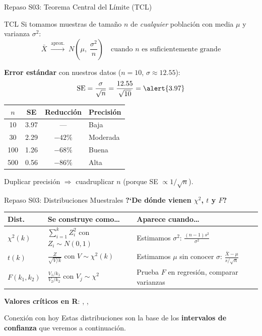\documentclass[aspectratio=169, 11pt]{beamer}
\begin{document}
\begin{frame}{Repaso S03: Teorema Central del L\'imite (TCL)}
\begin{block}{TCL}
Si tomamos muestras de tama\~no $n$ de \emph{cualquier} poblaci\'on con media $\mu$ y varianza $\sigma^2$:
\[
\bar{X} \;\xrightarrow{\text{aprox.}}\; N\!\left(\mu, \;\frac{\sigma^2}{n}\right)
\quad\text{cuando $n$ es suficientemente grande}
\]
\end{block}

\textbf{Error est\'andar} con nuestros datos ($n = 10$, $\sigma \approx 12.55$):
\[
\text{SE} = \frac{\sigma}{\sqrt{n}} = \frac{12.55}{\sqrt{10}} = \alert{3.97}
\]

\vspace{0.2cm}
\begin{table}
\centering
\small
\begin{tabular}{cccl}
\toprule
$n$ & SE & Reducci\'on & Precisi\'on \\
\midrule
10  & 3.97 & --- & Baja \\
30  & 2.29 & $-42\%$ & Moderada \\
100 & 1.26 & $-68\%$ & Buena \\
500 & 0.56 & $-86\%$ & Alta \\
\bottomrule
\end{tabular}
\end{table}

\small Duplicar precisi\'on $\Rightarrow$ cuadruplicar $n$ (porque SE $\propto 1/\sqrt{n}$).
\end{frame}

\begin{frame}{Repaso S03: Distribuciones Muestrales}
\textbf{?`De d\'onde vienen $\chi^2$, $t$ y $F$?}

\vspace{0.3cm}
\begin{tabular}{p{1.5cm}p{5cm}p{4.5cm}}
\toprule
\textbf{Dist.} & \textbf{Se construye como\ldots} & \textbf{Aparece cuando\ldots} \\
\midrule
$\chi^2(k)$ &
  $\sum_{i=1}^{k} Z_i^2$ con $Z_i \sim N(0,1)$ &
  Estimamos $\sigma^2$: $\frac{(n-1)s^2}{\sigma^2}$ \\[8pt]
$t(k)$ &
  $\frac{Z}{\sqrt{V/k}}$ con $V \sim \chi^2(k)$ &
  Estimamos $\mu$ sin conocer $\sigma$: $\frac{\bar{X}-\mu}{s/\sqrt{n}}$ \\[8pt]
$F(k_1,k_2)$ &
  $\frac{V_1/k_1}{V_2/k_2}$ con $V_j \sim \chi^2$ &
  Prueba $F$ en regresi\'on, comparar varianzas \\
\bottomrule
\end{tabular}

\vspace{0.3cm}
\small
\textbf{Valores cr\'iticos en R}: , , 

\vspace{0.3cm}
\normalsize
\begin{alertblock}{Conexi\'on con hoy}
Estas distribuciones son la base de los \textbf{intervalos de confianza} que veremos a continuaci\'on.
\end{alertblock}
\end{frame}
\end{document}
